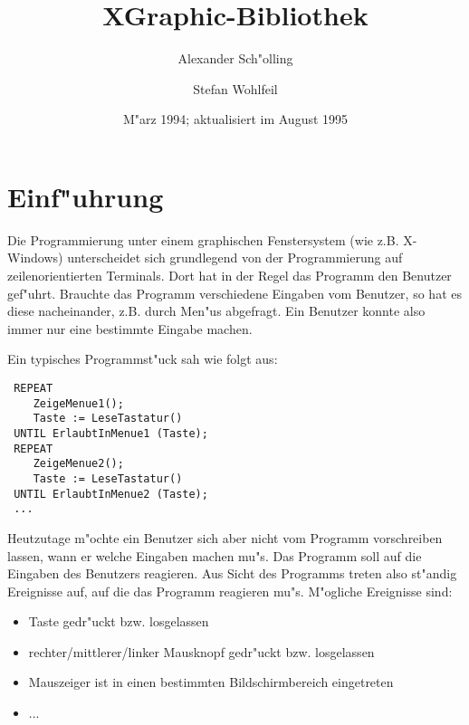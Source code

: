 \pagestyle{headings}

\title{XGraphic-Bibliothek}
\author{Alexander Sch"olling \and
Stefan Wohlfeil}
\date{M"arz 1994; aktualisiert im August 1995}


\maketitle





\section{Einf"uhrung}

 Die Programmierung unter einem graphischen Fenstersystem (wie z.B. 
 X-Windows) unterscheidet sich grundlegend von der Programmierung auf
 zeilenorientierten Terminals.
 Dort hat in der Regel das Programm den Benutzer gef"uhrt. Brauchte
 das Programm verschiedene Eingaben vom Benutzer, so hat es diese
 nacheinander, z.B. durch Men"us abgefragt. Ein Benutzer konnte also
 immer nur eine bestimmte Eingabe machen.

 Ein typisches Programmst"uck sah wie folgt aus:
\begin{verbatim}
 REPEAT
    ZeigeMenue1();
    Taste := LeseTastatur()
 UNTIL ErlaubtInMenue1 (Taste);
 REPEAT
    ZeigeMenue2();
    Taste := LeseTastatur()
 UNTIL ErlaubtInMenue2 (Taste);
 ...
\end{verbatim}

 Heutzutage m"ochte ein Benutzer sich aber nicht vom Programm vorschreiben
 lassen, wann er welche Eingaben machen mu"s. Das Programm soll auf die
 Eingaben des Benutzers reagieren. Aus Sicht des Programms treten also
 st"andig Ereignisse auf, auf die das Programm reagieren mu"s. M"ogliche
 Ereignisse sind:

\begin{itemize}
   \item Taste gedr"uckt bzw. losgelassen
   \item rechter/mittlerer/linker Mausknopf gedr"uckt bzw. losgelassen
   \item Mauszeiger ist in einen bestimmten Bildschirmbereich eingetreten
   \item ...
\end{itemize}

